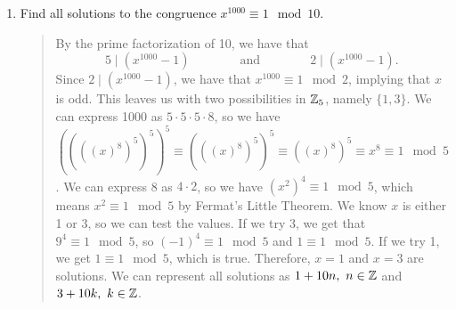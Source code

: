 \documentclass{hw}
\begin{document}
\begin{enumerate}
\item Find all solutions to the congruence $x^{1000}\equiv1\mod10$.
\begin{quote}
By the prime factorization of 10, we have that
\[
5\mid(x^{1000}-1)\qquad\qquad\text{and}\qquad\qquad2\mid(x^{1000}-1).
\]
Since $2\mid(x^{1000}-1)$, we have that $x^{1000}\equiv1\mod2$, implying that $x$ is odd. This leaves
us with two possibilities in $\mathbb{Z}_{5}$, namely $\{1,3\}$. We can express 1000 as $5\cdot5\cdot5\cdot8$,
so we have
$((((x)^{8})^{5})^{5})^{5}\equiv(((x)^{8})^{5})^{5}\equiv((x)^{8})^{5}\equiv x^{8}\equiv1\mod5$.
We can express 8 as $4\cdot2$, so we have $(x^{2})^{4}\equiv1\mod5$, which means $x^{2}\equiv1\mod5$
by Fermat's Little Theorem. We know $x$ is either 1 or 3, so we can test the values. If we try 3, we
get that $9^{4}\equiv1\mod5$, so $(-1)^{4}\equiv1\mod5$ and $1\equiv1\mod5$. If we try 1, we
get $1\equiv1\mod5$, which is true. Therefore, $x=1$ and $x=3$ are solutions. We can represent all
solutions as $1+10n,\ n\in\mathbb{Z}$ and $3+10k,\ k\in\mathbb{Z}$.
\end{quote}
\end{enumerate}
\end{document}
